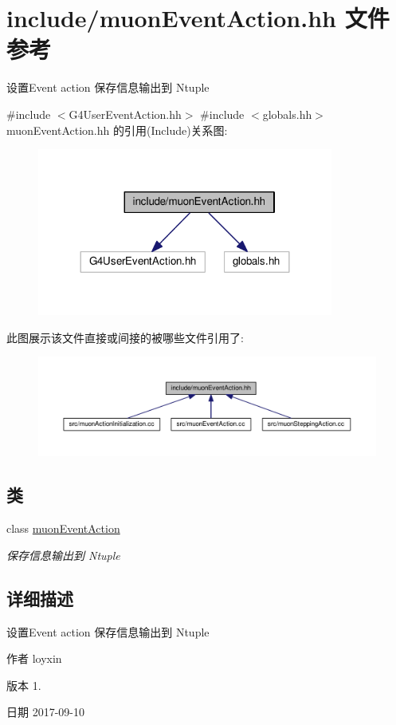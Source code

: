 \hypertarget{muonEventAction_8hh}{}\section{include/muon\+Event\+Action.hh 文件参考}
\label{muonEventAction_8hh}


设置\+Event action 保存信息输出到 Ntuple  


{\ttfamily \#include $<$G4\+User\+Event\+Action.\+hh$>$}\newline
{\ttfamily \#include $<$globals.\+hh$>$}\newline
muon\+Event\+Action.\+hh 的引用(Include)关系图\+:\nopagebreak
\begin{figure}[H]
\begin{center}
\leavevmode
\includegraphics[width=276pt]{muonEventAction_8hh__incl}
\end{center}
\end{figure}
此图展示该文件直接或间接的被哪些文件引用了\+:\nopagebreak
\begin{figure}[H]
\begin{center}
\leavevmode
\includegraphics[width=350pt]{muonEventAction_8hh__dep__incl}
\end{center}
\end{figure}
\subsection*{类}
\begin{DoxyCompactItemize}
\item 
class \hyperlink{classmuonEventAction}{muon\+Event\+Action}
\begin{DoxyCompactList}\small\item\em 保存信息输出到 Ntuple \end{DoxyCompactList}\end{DoxyCompactItemize}


\subsection{详细描述}
设置\+Event action 保存信息输出到 Ntuple 

\begin{DoxyAuthor}{作者}
loyxin 
\end{DoxyAuthor}
\begin{DoxyVersion}{版本}
1. 
\end{DoxyVersion}
\begin{DoxyDate}{日期}
2017-\/09-\/10 
\end{DoxyDate}
